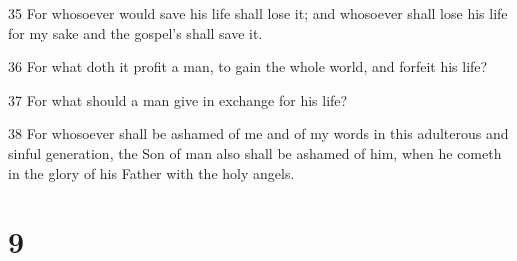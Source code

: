 \par 35 For whosoever would save his life shall lose it; and whosoever shall lose his life for my sake and the gospel's shall save it.
\par 36 For what doth it profit a man, to gain the whole world, and forfeit his life?
\par 37 For what should a man give in exchange for his life?
\par 38 For whosoever shall be ashamed of me and of my words in this adulterous and sinful generation, the Son of man also shall be ashamed of him, when he cometh in the glory of his Father with the holy angels.

\chapter{9}

